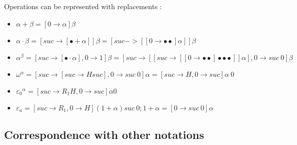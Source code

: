 \documentclass[10pt]{article}
\begin{document}
Operations can be represented with replacements :

\begin{itemize}
     \setlength{\itemsep}{1pt}
     \setlength{\parskip}{0pt}
     \setlength{\parsep}{0pt}

\item \( \alpha+\beta = [0 \rightarrow \alpha] \beta \)
\item \( \alpha \cdot \beta = [suc \rightarrow [\bullet+\alpha]] \beta = [suc->[[0 \rightarrow \bullet\bullet] \alpha]] \beta \)
\item \( \alpha^\beta = [suc \rightarrow [\bullet \cdot \alpha], 0 \rightarrow 1] \beta = [suc \rightarrow [[suc \rightarrow[[0 \rightarrow \bullet\bullet] \bullet\bullet\bullet]] \alpha], 0 \rightarrow suc\ 0] \beta \)
\item \( \omega^\alpha = [suc \rightarrow [suc \rightarrow H suc], 0 \rightarrow suc\ 0] \alpha = [suc \rightarrow H,0 \rightarrow suc] \alpha\ 0 \) 
\item \( {\varepsilon_0}^\alpha = [suc \rightarrow R_1 H,0 \rightarrow suc] \alpha 0 \)
\item \( \varepsilon_a = [suc \rightarrow R_1, 0 \rightarrow H] (1+\alpha) suc\ 0 ; 1+\alpha = [0 \rightarrow suc\ 0] \alpha \) 

\end{itemize}



\subsection{Correspondence with other notations}
\end{document}
